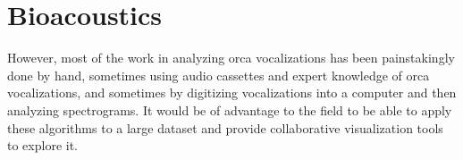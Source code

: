 \section{Bioacoustics}





However, most of the work in analyzing orca vocalizations has been
painstakingly done by hand, sometimes using audio cassettes and expert
knowledge of orca vocalizations, and sometimes by digitizing
vocalizations into a computer and then analyzing spectrograms.  It
would be of advantage to the field to be able to apply these
algorithms to a large dataset and provide collaborative visualization
tools to explore it.











